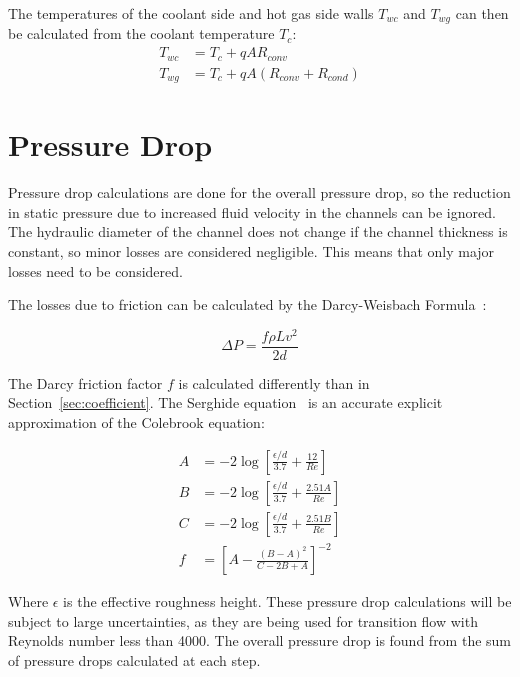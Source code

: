 \documentclass[11pt]{article}
\begin{document}
The temperatures of the coolant side and hot gas side walls $T_{wc}$ and $T_{wg}$ can then be calculated from the coolant temperature $T_c$:
\begin{align}
  T_{wc} & = T_c + q A R_{conv} \\
  T_{wg} & = T_c + q A (R_{conv} + R_{cond})
\end{align}

\section{Pressure Drop}

Pressure drop calculations are done for the overall pressure drop, so the reduction in static pressure due to increased fluid velocity in the channels can be ignored. The hydraulic diameter of the channel does not change if the channel thickness is constant, so minor losses are considered negligible. This means that only major losses need to be considered.

The losses due to friction can be calculated by the Darcy-Weisbach Formula~\cite{2009crane}:

\begin{equation}
  \Delta P = \frac{f \rho L v^2}{2d}
\end{equation}

The Darcy friction factor $f$ is calculated differently than in Section~\ref{sec:coefficient}. The Serghide equation~\cite{2009crane} is an accurate explicit approximation of the Colebrook equation:

\begin{align}
  A & = -2 \log \left[\frac{\epsilon / d}{3.7} + \frac{12}{Re} \right] \nonumber \\
  B & = -2 \log \left[ \frac{\epsilon / d}{3.7} + \frac{2.51A}{Re}\right] \nonumber \\
  C & = -2 \log \left[ \frac{\epsilon / d}{3.7} + \frac{2.51B}{Re}\right] \nonumber \\
  f & = \left[ A - \frac{(B - A)^2 }{C - 2B + A} \right]^{-2}
\end{align}

Where $\epsilon$ is the effective roughness height. These pressure drop calculations will be subject to large uncertainties, as they are being used for transition flow with Reynolds number less than 4000. The overall pressure drop is found from the sum of pressure drops calculated at each step.

\printbibliography
\end{document}
